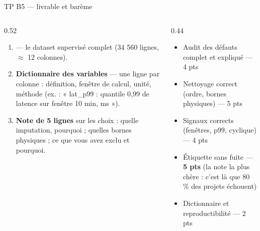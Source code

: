 \begin{frame}{TP B5 --- livrable et barème}
\begin{columns}[t]
\begin{column}{0.52\textwidth}
\begin{abox}[À rendre]
\begin{enumerate}
\item \textbf{} --- le dataset supervisé complet
(34 560 lignes, $\approx$ 12 colonnes).
\item \textbf{Dictionnaire des variables} --- une ligne par colonne :
définition, fenêtre de calcul, unité, méthode (ex. : « lat\_p99 :
quantile 0,99 de latence sur fenêtre 10 min, ms »).
\item \textbf{Note de 5 lignes} sur les choix : quelle imputation, pourquoi ;
quelles bornes physiques ; ce que vous avez exclu et pourquoi.
\end{enumerate}
\end{abox}
\end{column}
\begin{column}{0.44\textwidth}
\begin{kbox}
\begin{itemize}
\item Audit des défauts complet et expliqué --- 4 pts
\item Nettoyage correct (ordre, bornes physiques) --- 5 pts
\item Signaux corrects (fenêtres, p99, cyclique) --- 4 pts
\item Étiquette sans fuite --- \textbf{5 pts} (la note la plus chère :
c'est là que 80 \% des projets échouent)
\item Dictionnaire et reproductibilité --- 2 pts
\end{itemize}
\end{kbox}
\end{column}
\end{columns}
\end{frame}

